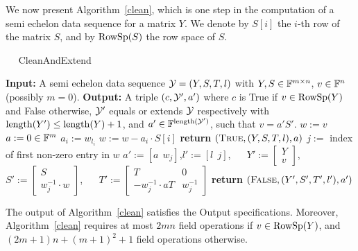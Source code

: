 \medskip
We now present Algorithm~\ref{clean}, which is one step in the
computation of a semi echelon data sequence for a matrix $Y$. We
denote by $S[i]$ the $i$-th row of the matrix $S$, and by $\mathrm{RowSp}(S)$ the 
row space of $S$.

\begin{algorithm}
\caption{$\quad$ \sc CleanAndExtend}
\label{clean}
\begin{algorithmic}
\STATE \textbf{Input:} A semi echelon data sequence $\mathcal{Y}=(Y,S,T,l)$ with 
         $Y,S \in \mathbb{F}^{m \times n}$, $v \in \mathbb{F}^n$ (possibly $m=0$).
\STATE \textbf{Output:} A triple $(c,\mathcal{Y}',a')$ where $c$ is {\sc True} 
if $v \in \mathrm{RowSp}(Y)$ and {\sc False} otherwise, $\mathcal{Y}'$ equals or 
extends $\mathcal{Y}$ respectively with $\mathrm{length}(Y') \le \mathrm{length}(Y)+1$, 
and $a'\in\mathbb{F}^{\mathrm{length} (\mathcal{Y}')}$, such that $v = a'S'$.
\vspace*{2mm}
\STATE $w := v$
\STATE $a := 0 \in \mathbb{F}^m$
    \STATE $a_i := w_{l_i}$
    \STATE $w := w - a_i \cdot S[i]$
\ENDFOR\hspace*{6mm}
    \STATE \textbf{return} $(\mbox{\sc True},(Y,S,T,l),a)$
\ELSE
    \STATE $j := $ index of first non-zero entry in $w$
    \STATE $a' := [ a \ \ w_j ]$,\quad $l' := \left[ l \ \ j \right]$, $\quad$
    \STATE $Y' := \left[ 
       \begin{array}{c} Y \\ v \end{array} \right]$, $\quad$
           $S' := \left[ 
       \begin{array}{c} S \\ w_j^{-1} \cdot w \end{array} \right]$, $\quad$
           $T' := \left[ 
       \begin{array}{cc} T & 0 \\ -w_j^{-1}\cdot aT & w_j^{-1} 
       \end{array} \right]$
    \STATE \textbf{return} $(\mbox{\sc False}, (Y',S',T',l'), a' )$
\ENDIF
\end{algorithmic}
\end{algorithm}

\begin{Prop}
The output of Algorithm~\ref{clean} satisfies the Output
specifications.
Moreover, Algorithm~\ref{clean} requires at most $2mn$ field operations
if $v\in\mathrm{RowSp}(Y)$, and
$(2m+1)n + (m+1)^2 + 1$ field operations otherwise.
\end{Prop}


